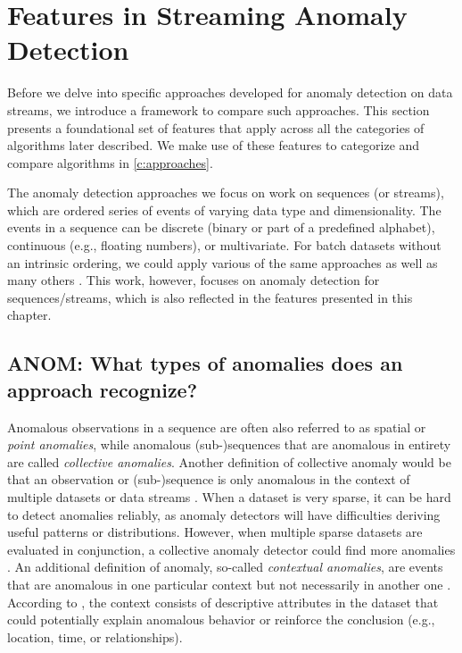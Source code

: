 \chapter{Features in Streaming Anomaly Detection}
\label{c:features}

Before we delve into specific approaches developed for anomaly detection on data streams, we introduce a framework to compare such approaches. This section presents a foundational set of features that apply across all the categories of algorithms later described. We make use of these features to categorize and compare algorithms in \cref{c:approaches}.

The anomaly detection approaches we focus on work on sequences (or streams), which are ordered series of events of varying data type and dimensionality. The events in a sequence can be discrete (binary or part of a predefined alphabet), continuous (e.g., floating numbers), or multivariate. For batch datasets without an intrinsic ordering, we could apply various of the same approaches as well as many others \citep{hodge_survey_2004, chandola_anomaly_2009}. This work, however, focuses on anomaly detection for sequences/streams, which is also reflected in the features presented in this chapter.


\section{ANOM: What types of anomalies does an approach recognize?}

Anomalous observations in a sequence are often also referred to as spatial or \emph{point anomalies}, while anomalous (sub-)sequences that are anomalous in entirety are called \emph{collective anomalies}. Another definition of collective anomaly would be that an observation or (sub-)sequence is only anomalous in the context of multiple datasets or data streams \citep{chandola_anomaly_2012}. When a dataset is very sparse, it can be hard to detect anomalies reliably, as anomaly detectors will have difficulties deriving useful patterns or distributions. However, when multiple sparse datasets are evaluated in conjunction, a collective anomaly detector could find more anomalies \citep{zheng_detecting_2015}. An additional definition of anomaly, so-called \emph{contextual anomalies}, are events that are anomalous in one particular context but not necessarily in another one \citep{chandola_anomaly_2012}. According to \citet{hayes_contextual_2015}, the context consists of descriptive attributes in the dataset that could potentially explain anomalous behavior or reinforce the conclusion (e.g., location, time, or relationships).

